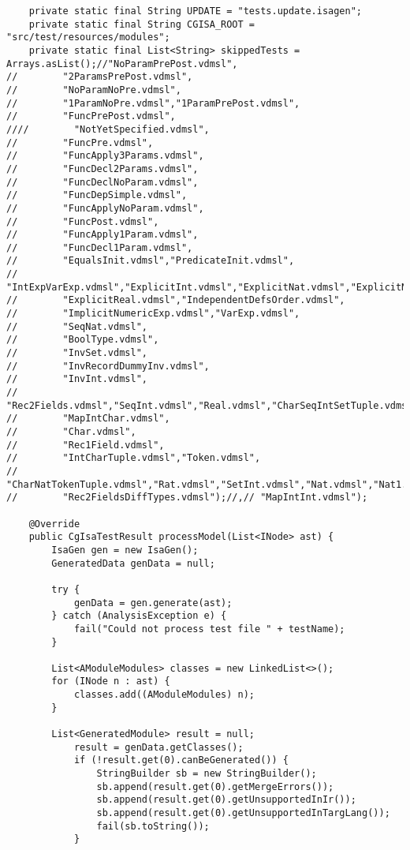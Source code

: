 \begin{appendices}
\begin{lstlisting}
    private static final String UPDATE = "tests.update.isagen";
    private static final String CGISA_ROOT = "src/test/resources/modules";
    private static final List<String> skippedTests = Arrays.asList();//"NoParamPrePost.vdmsl",
//        "2ParamsPrePost.vdmsl",
//        "NoParamNoPre.vdmsl",
//        "1ParamNoPre.vdmsl","1ParamPrePost.vdmsl",
//        "FuncPrePost.vdmsl",
////        "NotYetSpecified.vdmsl",
//        "FuncPre.vdmsl",
//        "FuncApply3Params.vdmsl",
//        "FuncDecl2Params.vdmsl",
//        "FuncDeclNoParam.vdmsl",
//        "FuncDepSimple.vdmsl",
//        "FuncApplyNoParam.vdmsl",
//        "FuncPost.vdmsl",
//        "FuncApply1Param.vdmsl",
//        "FuncDecl1Param.vdmsl",
//        "EqualsInit.vdmsl","PredicateInit.vdmsl",
//        "IntExpVarExp.vdmsl","ExplicitInt.vdmsl","ExplicitNat.vdmsl","ExplicitNat1.vdmsl",
//        "ExplicitReal.vdmsl","IndependentDefsOrder.vdmsl",
//        "ImplicitNumericExp.vdmsl","VarExp.vdmsl",
//        "SeqNat.vdmsl",
//        "BoolType.vdmsl",
//        "InvSet.vdmsl",
//        "InvRecordDummyInv.vdmsl",
//        "InvInt.vdmsl",
//        "Rec2Fields.vdmsl","SeqInt.vdmsl","Real.vdmsl","CharSeqIntSetTuple.vdmsl","IntIntTuple.vdmsl",
//        "MapIntChar.vdmsl",
//        "Char.vdmsl",
//        "Rec1Field.vdmsl",
//        "IntCharTuple.vdmsl","Token.vdmsl",
//        "CharNatTokenTuple.vdmsl","Rat.vdmsl","SetInt.vdmsl","Nat.vdmsl","Nat1.vdmsl",
//        "Rec2FieldsDiffTypes.vdmsl");//,// "MapIntInt.vdmsl");

    @Override
    public CgIsaTestResult processModel(List<INode> ast) {
        IsaGen gen = new IsaGen();
        GeneratedData genData = null;

        try {
            genData = gen.generate(ast);
        } catch (AnalysisException e) {
            fail("Could not process test file " + testName);
        }

        List<AModuleModules> classes = new LinkedList<>();
        for (INode n : ast) {
            classes.add((AModuleModules) n);
        }

        List<GeneratedModule> result = null;
            result = genData.getClasses();
            if (!result.get(0).canBeGenerated()) {
                StringBuilder sb = new StringBuilder();
                sb.append(result.get(0).getMergeErrors());
                sb.append(result.get(0).getUnsupportedInIr());
                sb.append(result.get(0).getUnsupportedInTargLang());
                fail(sb.toString());
            }


\end{lstlisting}
\end{appendices}
